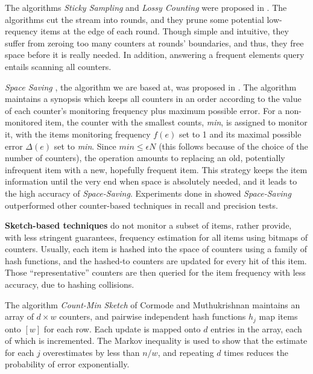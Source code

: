 \documentclass[conference]{IEEEtran}
\begin{document}
The algorithms \emph{Sticky Sampling} and \emph{Lossy Counting} were proposed in \cite{IEEEexample:sticky}. The algorithms cut the stream into rounds, and they prune some potential low-requency items at the edge of each round. Though simple and intuitive, they suffer from zeroing too many counters at rounds’ boundaries, and thus, they free space before it is really needed. In addition, answering a frequent elements query entails scanning all counters.\par

\emph{Space Saving} , the algorithm we are based at, was proposed in \cite{IEEEexample:spacesaving}. The algorithm maintains a synopsis which keeps all counters in an order according to the value of each counter's monitoring frequency plus maximum possible error. For a non-monitored item, the counter with the smallest counts, \emph{min}, is assigned to monitor it, with the items monitoring frequency $f(e)$ set to 1 and its maximal possible error $\Delta(e)$ set to \emph{min}. Since $min\leq\epsilon N$ (this follows because of the choice of the number of counters), the operation amounts to replacing an old, potentially infrequent item with a new, hopefully frequent item. This strategy keeps the item information until the very end when space is absolutely needed, and it leads to the high accuracy of \emph{Space-Saving}. Experiments done in \cite{IEEEexample:overview_vldbj,IEEEexample:overview} showed \emph{Space-Saving} outperformed other counter-based techniques in recall and precision tests.\par

\textbf{Sketch-based techniques} do not monitor a subset of items, rather provide, with less stringent guarantees, frequency estimation for all items using bitmaps of counters. Usually, each item is hashed into the space of counters using a family of hash functions, and the hashed-to counters are updated for every hit of this item. Those “representative” counters are then queried for the item frequency with less accuracy, due to hashing collisions.\par

The algorithm \emph{Count-Min Sketch} of Cormode and Muthukrishnan \cite{IEEEexample:count-min} maintains an array of $d\times w$ counters, and pairwise independent hash functions $h_j$ map items onto $[w]$ for each row. Each update is mapped onto $d$ entries in the array, each of which is incremented. The Markov inequality is used to show that the estimate for each $j$ overestimates by less than $n/w$, and repeating $d$ times reduces the probability of error exponentially.\par
\end{document}
